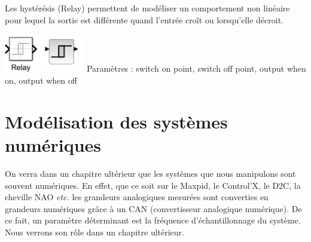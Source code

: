 \documentclass[10pt,fleqn]{article} %
\begin{document}
\noindent \begin{minipage}[c]{.54\linewidth}
\indent Les hystérésis (Relay) permettent de modéliser un comportement non linéaire pour lequel la sortie est différente quand l'entrée croît ou lorsqu'elle décroit. 



\end{minipage}
\hfill
\begin{minipage}[c]{.18\linewidth}
\begin{center}
\includegraphics[width=3.5cm]{images/hysteresis}
Paramètres : switch on point, switch off point, output when on, output when off
\end{center}
\end{minipage}
\hfill
\begin{minipage}[c]{.22\linewidth}
\begin{center}
\end{center}
\end{minipage}


\section{Modélisation des systèmes numériques}
On verra dans un chapitre ultérieur que les systèmes que nous manipulons sont souvent numériques. En effet, que ce soit sur le Maxpid, le Control'X, le D2C, la cheville NAO \textit{etc.} les grandeurs analogiques mesurées sont converties en grandeurs numériques grâce à un CAN (convertisseur analogique numérique). De ce fait, un paramètre déterminant est la fréquence d'échantillonnage du système. Nous verrons son rôle dans un chapitre ultérieur.
\end{document}
